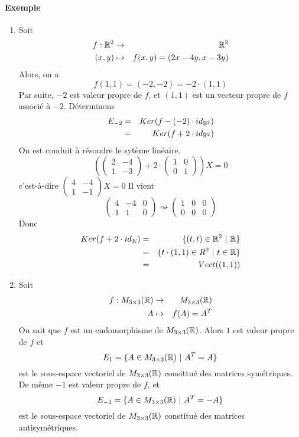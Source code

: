 \paragraph{Exemple}
\begin{enumerate}
  \item Soit 
    \begin{eqnarray*}
      f: \mathbb{R}^2 &\rightarrow& \mathbb{R}^2 \\
      (x, y) &\mapsto& f(x, y) = (2x - 4 y, x -3 y)
    \end{eqnarray*}
    Alors, on a 
    $$f(1, 1) = (-2, -2) = -2 \cdot (1, 1)$$
    Par suite, $-2$ est valeur propre de $f$, et $(1, 1)$ est un vecteur propre de $f$ associé à $-2$. Déterminons 
    \begin{eqnarray*}
      E_{-2} &=& Ker(f-(-2)\cdot id_{\mathbb{R}^2} ) \\
        &=& Ker(f + 2 \cdot id_{\mathbb{R}^2})
    \end{eqnarray*}
    On est conduit à résoudre le sytème linéaire.
    $$\left(\begin{pmatrix}
        2 & -4 \\
        1 & -3
      \end{pmatrix} + 2 \cdot
      \begin{pmatrix}
        1 & 0 \\
        0 & 1
      \end{pmatrix} \right) X = 0$$
    c'est-à-dire $\begin{pmatrix} 4 & -4 \\ 1 & -1 \end{pmatrix} X = 0$ Il vient
    $$\left( \begin{array}{cc|c} 4 & -4 & 0 \\ 1 & 1 & 0 \end{array} \right) \rightsquigarrow \left( \begin{array}{cc|c} 1 & 0 & 0 \\ 0 & 0 & 0 \end{array} \right) $$
    Donc 
    \begin{eqnarray*}
      Ker(f + 2 \cdot id_E) &=& \{(t, t) \in \mathbb{R}^2 ~ \vert ~ \mathbb{R} \} \\
        &=& \{t \cdot (1, 1) \in R^2 ~ \vert ~ t \in \mathbb{R} \} \\
        &=& Vect((1, 1))
    \end{eqnarray*}
    
  \item Soit 
    \begin{eqnarray*}
      f: M_{3 \times 3}(\mathbb{R}) &\rightarrow& M_{3 \times 3}(\mathbb{R}) \\
      A &\mapsto& f(A) = A^{T}
    \end{eqnarray*}
    On sait que $f$ est un endomorphisme de $M_{3 \times 3}(\mathbb{R})$. Alors $1$ est valeur propre de $f$ et
    $$E_{1} = \{A \in M_{3 \times 3}(\mathbb{R}) ~ \vert ~ A^{T} = A \}$$
    est le sous-espace vectoriel de $M_{3 \times 3}(\mathbb{R})$ consittué des matrices symétriques. \\
    De même $-1$ est valeur propre de $f$, et
    $$E_{-1} = \{A \in M_{3\times 3}(\mathbb{R}) ~ \vert ~ A^{T} = -A\}$$
    est le sous-espace vectoriel de $M_{3\times 3}(\mathbb{R})$ constitué des matrices antisymétriques.
    

\end{enumerate}
